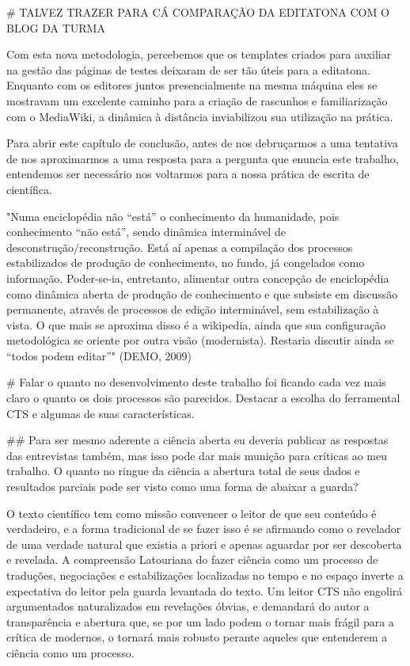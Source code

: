 # TALVEZ TRAZER PARA CÁ COMPARAÇÃO DA EDITATONA COM O BLOG DA TURMA


Com esta nova metodologia, percebemos que os templates criados para auxiliar na gestão das páginas de testes deixaram de ser tão úteis para a editatona. Enquanto com os editores juntos presencialmente na mesma máquina eles se mostravam um excelente caminho para a criação de rascunhos e familiarização com o MediaWiki, a dinâmica à distância inviabilizou sua utilização na prática.


Para abrir este capítulo de conclusão, antes de nos debruçarmos a uma tentativa de nos aproximarmos a uma resposta para a pergunta que enuncia este trabalho, entendemos ser necessário nos voltarmos para a nossa prática de escrita de científica.

"Numa enciclopédia não “está” o conhecimento da humanidade, pois conhecimento “não está”, sendo dinâmica interminável de desconstrução/reconstrução. Está aí apenas a compilação dos processos estabilizados de produção de conhecimento, no fundo, já congelados como informação. Poder-se-ia, entretanto, alimentar outra concepção de enciclopédia como dinâmica aberta de produção de conhecimento e que subsiste em discussão permanente, através de processos de edição interminável, sem estabilização à vista. O que mais se aproxima disso é a wikipedia, ainda que sua configuração metodológica se oriente por outra visão (modernista). Restaria discutir ainda se “todos podem editar”" (DEMO, 2009)

# Falar o quanto no desenvolvimento deste trabalho foi ficando cada vez mais claro o quanto os dois processos são parecidos. Destacar a escolha do ferramental CTS e algumas de suas características.

## Para ser mesmo aderente a ciência aberta eu deveria publicar as respostas das entrevistas também, mas isso pode dar mais munição para críticas ao meu trabalho.
O quanto no ringue da ciência a abertura total de seus dados e resultados parciais pode ser visto como uma forma de abaixar a guarda?

O texto científico tem como missão convencer o leitor de que seu conteúdo é verdadeiro, e a forma tradicional de se fazer isso é se afirmando como o revelador de uma verdade natural que existia a priori e apenas aguardar por ser descoberta e revelada. A compreensão Latouriana do fazer ciência como um processo de traduções, negociações e estabilizações localizadas no tempo e no espaço inverte a expectativa do leitor pela guarda levantada do texto. Um leitor CTS não engolirá argumentados naturalizados em revelações óbvias, e demandará do autor a transparência e abertura que, se por um lado podem o tornar mais frágil para a crítica de modernos, o tornará mais robusto perante aqueles que entenderem a ciência como um processo.

